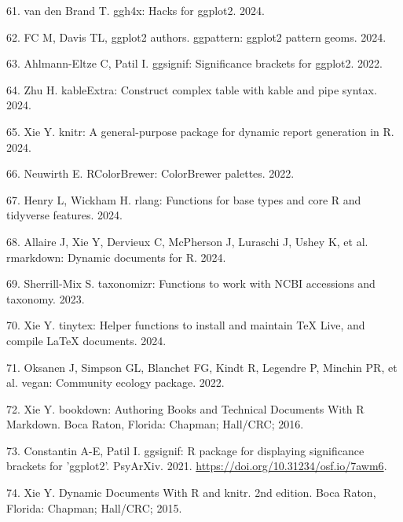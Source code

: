 \documentclass[
  12 pt,
]{article}
\newlength{\cslhangindent}
\newlength{\cslentryspacingunit} %
\newenvironment{CSLReferences}[2] %
 {%
  \setlength{\parindent}{0pt}
  \ifodd #1
  \let\oldpar\par
  \def\par{\hangindent=\cslhangindent\oldpar}
  \fi
  \setlength{\parskip}{#2\cslentryspacingunit}
 }%
 {}
\begin{document}
\begin{CSLReferences}{0}{0}
\leavevmode{}%
61. van den Brand T. ggh4x: Hacks for ggplot2. 2024.

\leavevmode{}%
62. FC M, Davis TL, ggplot2 authors. {ggpattern}: ggplot2 pattern geoms. 2024.

\leavevmode{}%
63. Ahlmann-Eltze C, Patil I. {ggsignif}: Significance brackets for ggplot2. 2022.

\leavevmode{}%
64. Zhu H. kableExtra: Construct complex table with kable and pipe syntax. 2024.

\leavevmode{}%
65. Xie Y. {knitr}: A general-purpose package for dynamic report generation in {R}. 2024.

\leavevmode{}%
66. Neuwirth E. RColorBrewer: ColorBrewer palettes. 2022.

\leavevmode{}%
67. Henry L, Wickham H. {rlang}: Functions for base types and core {R} and tidyverse features. 2024.

\leavevmode{}%
68. Allaire J, Xie Y, Dervieux C, McPherson J, Luraschi J, Ushey K, et al. {rmarkdown}: Dynamic documents for {R}. 2024.

\leavevmode{}%
69. Sherrill-Mix S. {taxonomizr}: Functions to work with NCBI accessions and taxonomy. 2023.

\leavevmode{}%
70. Xie Y. {tinytex}: Helper functions to install and maintain {TeX Live}, and compile LaTeX documents. 2024.

\leavevmode{}%
71. Oksanen J, Simpson GL, Blanchet FG, Kindt R, Legendre P, Minchin PR, et al. {vegan}: Community ecology package. 2022.

\leavevmode{}%
72. Xie Y. {{bookdown}: Authoring Books and Technical Documents With {R} {Markdown}}. Boca Raton, Florida: Chapman; Hall/CRC; 2016.

\leavevmode{}%
73. Constantin A-E, Patil I. {ggsignif}: {R} package for displaying significance brackets for {'ggplot2'}. PsyArXiv. 2021. \url{https://doi.org/10.31234/osf.io/7awm6}.

\leavevmode{}%
74. Xie Y. {Dynamic Documents With {R} and knitr}. 2nd edition. Boca Raton, Florida: Chapman; Hall/CRC; 2015.


\end{CSLReferences}
\end{document}
